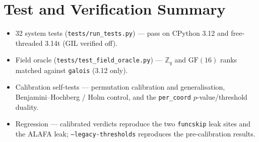 \documentclass[11pt]{article}
\newcommand{\code}[1]{\texttt{#1}}
\newcommand{\Zq}{\ensuremath{\mathbb{Z}_q}}
\newcommand{\GF}[1]{\ensuremath{\mathrm{GF}(#1)}}
\begin{document}
\section{Test and Verification Summary}
\begin{itemize}[leftmargin=1.4em]
  \item 32 system tests (\code{tests/run\_tests.py}) --- pass on CPython 3.12 and
  free-threaded 3.14t (GIL verified off).
  \item Field oracle (\code{tests/test\_field\_oracle.py}) --- \Zq{} and \GF{16}
  ranks matched against \code{galois} (3.12 only).
  \item Calibration self-tests --- permutation calibration and generalisation,
  Benjamini--Hochberg / Holm control, and the \code{per\_coord} $p$-value/threshold
  duality.
  \item Regression --- calibrated verdicts reproduce the two \code{funcskip} leak
  sites and the ALAFA leak; \code{--legacy-thresholds} reproduces the pre-calibration
  results.
\end{itemize}
\end{document}

